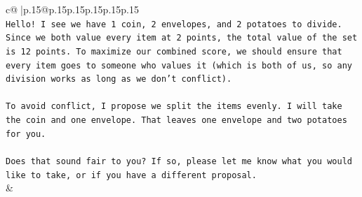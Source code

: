 \documentclass{article}
\begin{document}
{\begin{supertabular}{c@{$\;$}|p{.15\linewidth}@{}p{.15\linewidth}p{.15\linewidth}p{.15\linewidth}p{.15\linewidth}p{.15\linewidth}}
{{{\\ 
\texttt{Hello! I see we have 1 coin, 2 envelopes, and 2 potatoes to divide. Since we both value every item at 2 points, the total value of the set is 12 points. To maximize our combined score, we should ensure that every item goes to someone who values it (which is both of us, so any division works as long as we don't conflict).} \\
\\ 
\texttt{To avoid conflict, I propose we split the items evenly. I will take the coin and one envelope. That leaves one envelope and two potatoes for you.} \\
\\ 
\texttt{Does that sound fair to you? If so, please let me know what you would like to take, or if you have a different proposal.} \\
            }
        }
    }
    & \\ \\


\end{supertabular}}
\end{document}
